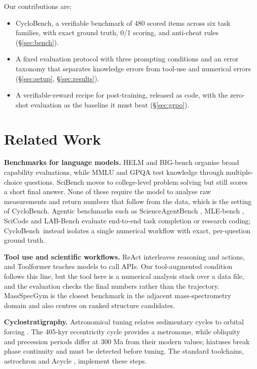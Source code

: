 \documentclass[10pt]{article}
\newcommand{\method}{CycloBench}
\begin{document}
Our contributions are:
\begin{itemize}[leftmargin=1.2em,itemsep=2pt]
  \item \method, a verifiable benchmark of 480 scored items across six task families, with exact
        ground truth, 0/1 scoring, and anti-cheat rules (\S\ref{sec:bench}).
  \item A fixed evaluation protocol with three prompting conditions and an error taxonomy
        that separates knowledge errors from tool-use and numerical errors
        (\S\ref{sec:setup}, \S\ref{sec:results}).
  \item A verifiable-reward recipe for post-training, released as code, with the zero-shot
        evaluation as the baseline it must beat (\S\ref{sec:grpo}).
\end{itemize}

\section{Related Work}
\label{sec:related}
\textbf{Benchmarks for language models.} HELM \citep{liang2022helm} and BIG-bench
\citep{srivastava2022bigbench} organise broad capability evaluations, while MMLU
\citep{hendrycks2021mmlu} and GPQA \citep{rein2023gpqa} test knowledge through multiple-choice
questions. SciBench \citep{wang2023scibench} moves to college-level problem solving but still
scores a short final answer. None of these require the model to analyse raw measurements and
return numbers that follow from the data, which is the setting of \method. Agentic benchmarks
such as ScienceAgentBench \citep{chen2024scienceagentbench}, MLE-bench \citep{chan2024mlebench},
SciCode \citep{tian2024scicode} and LAB-Bench \citep{laurent2024labbench} evaluate end-to-end
task completion or research coding; \method\ instead isolates a single numerical workflow with
exact, per-question ground truth.

\textbf{Tool use and scientific workflows.} ReAct \citep{yao2023react} interleaves reasoning
and actions, and Toolformer \citep{schick2023toolformer} teaches models to call APIs. Our
tool-augmented condition follows this line, but the tool here is a numerical analysis stack
over a data file, and the evaluation checks the final numbers rather than the trajectory.
MassSpecGym \citep{bushuiev2024massspecgym} is the closest benchmark in the adjacent
mass-spectrometry domain and also centres on ranked structure candidates.

\textbf{Cyclostratigraphy.} Astronomical tuning relates sedimentary cycles to orbital forcing
\citep{hinnov2007ats, hinnov2013cyclo}. The 405-kyr eccentricity cycle provides a metronome,
while obliquity and precession periods differ at 300 Ma from their modern values; hiatuses
break phase continuity and must be detected before tuning. The standard toolchains,
astrochron \citep{meyers2014astrochron} and Acycle \citep{li2019acycle}, implement these steps.
\end{document}
